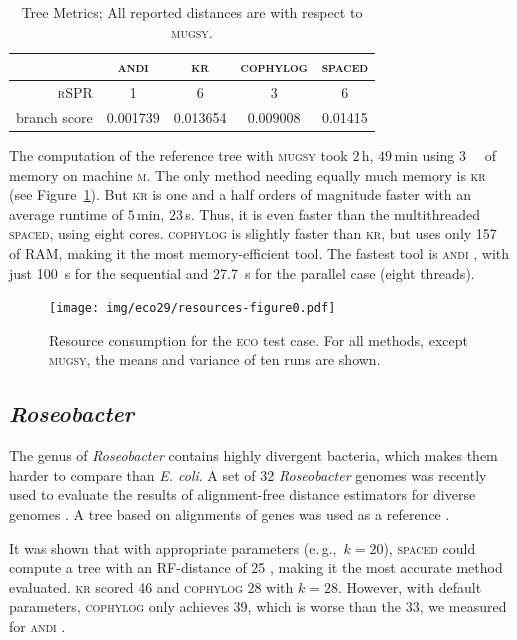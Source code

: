 \documentclass[a4paper,
  10pt,
  english,
  DIV=12,
  BCOR=8mm]{scrbook}
\newcommand{\local}{\textsc{m}\oldstylenums{1}\xspace}
\newcommand{\algo}[1]{\textsc{{#1}}}
\newcommand{\andi}{\algo{andi} }
\newcommand{\eco}{\textsc{eco}\oldstylenums{29}\xspace}
\begin{document}
\begin{table}
  \centering
  \caption[\eco Tree Metrics]{\label{table:eco-metrics}Tree Metrics; All reported distances are with respect to \algo{mugsy}.}
  \begin{tabular}{rcccc}
    \toprule
     & \algo{andi} & \algo{kr} & \algo{cophylog} & \algo{spaced} \\\midrule
    \algo{rSPR} & 1 & 6 & 3 & 6 \\
    branch score & 0.001739 & 0.013654 &  0.009008 & 0.01415 \\
    \bottomrule
  \end{tabular}
\end{table}

The computation of the reference tree with \algo{mugsy} took $2$\,h, $49$\,min using \SI{3}{\giga\byte} of memory on machine \local. The only method needing equally much memory is \algo{kr} (see Figure~\ref{fig:eco29-resource}). But \algo{kr} is one and a half orders of magnitude faster with an average runtime of $5$\,min, $23$\,s. Thus, it is even faster than the multithreaded \algo{spaced}, using eight cores. \algo{cophylog} is slightly faster than \algo{kr}, but uses only \SI{157}{\mega\byte} of \ac{RAM}, making it the most memory-efficient tool. The fastest tool is \andi, with just \SI{100}{\second} for the sequential and \SI{27.7}{\second} for the parallel case (eight threads).

\begin{figure}
  \centering
  \texttt{[image: img/eco29/resources-figure0.pdf]}
  \caption[Resource Consumption for the \eco Test Case.]{\label{fig:eco29-resource} Resource consumption for the \eco test case. For all methods, except \algo{mugsy}, the means and variance of ten runs are shown.}
\end{figure}

\subsection*{\textit{Roseobacter}}

The genus of \emph{Roseobacter} contains highly divergent bacteria, which makes them harder to compare than \emph{E. coli}. A set of 32 \emph{Roseobacter} genomes was recently used to evaluate the results of alignment-free distance estimators for diverse genomes \cite{spaced3}. A tree based on alignments of genes was used as a reference \cite{roseo}. 

It was shown that with appropriate parameters (e.\,g.,\ $k=20$), \algo{spaced} could compute a tree with an RF-distance of 25 \cite{rfdist}, making it the most accurate method evaluated. \algo{kr} scored 46 and \algo{cophylog} 28 with $k=28$. However, with default parameters, \algo{cophylog} only achieves 39, which is worse than the 33, we measured for \andi.
\end{document}
